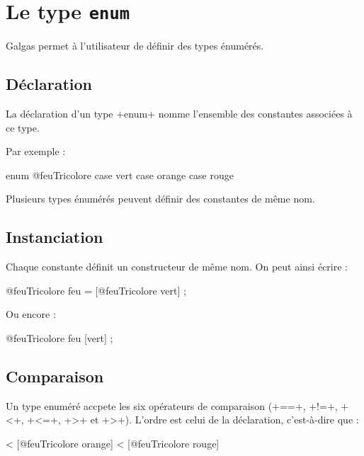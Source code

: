 
\chapter{Le type \texttt{enum}}

Galgas permet à l'utilisateur de définir des types énumérés.

\section{Déclaration}

La déclaration d'un type \ggs+enum+ nomme l'ensemble des constantes associées à ce type.

Par exemple :

\begin{galgas}
enum @feuTricolore {
  case vert
  case orange
  case rouge
}
\end{galgas}

Plusieurs types énumérés peuvent définir des constantes de même nom.

\section{Instanciation}

Chaque constante définit un constructeur de même nom. On peut ainsi écrire :

\begin{galgas}
@feuTricolore feu = [@feuTricolore vert] ;
\end{galgas}

Ou encore :

\begin{galgas}
@feuTricolore feu [vert] ;
\end{galgas}

\section{Comparaison}

Un type enuméré accpete les six opérateurs de comparaison (\ggs+==+, \ggs+!=+, \ggs+<+, \ggs+<=+, \ggs+>+ et \ggs+>+). L'ordre est celui de la déclaration, c'est-à-dire que :
\begin{galgas}
   < [@feuTricolore orange] < [@feuTricolore rouge]
\end{galgas}


